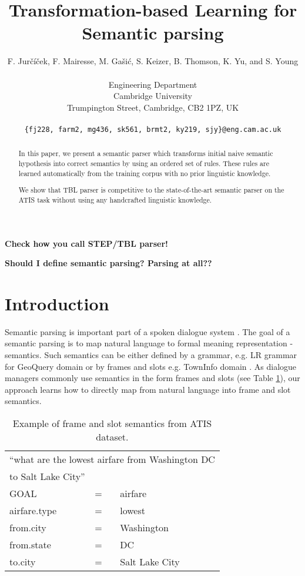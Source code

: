 \documentclass[11pt]{article}
\title{Transformation-based Learning for Semantic parsing}
\author{F. Jur\v{c}\'{i}\v{c}ek, F. Mairesse, M. Ga\v{s}i\'{c}, S. Keizer, B. Thomson, K. Yu, and S. Young \\
\\
Engineering Department \\
Cambridge University \\
Trumpington Street, Cambridge, CB2 1PZ, UK \\
\\
{\tt \{fj228, farm2, mg436, sk561, brmt2, ky219, sjy\}@eng.cam.ac.uk}
}
\date{}
\begin{document}
\maketitle
\begin{abstract}
In this paper, we present a semantic parser which transforms initial naive semantic hypothesis into correct semantics by using an ordered set of rules. These rules are learned automatically from the training corpus with no prior linguistic knowledge.

We show that TBL parser is competitive to the state-of-the-art semantic parser on the ATIS task without using any handcrafted linguistic knowledge.

\end{abstract}

\textbf{Check how you call STEP/TBL parser!}

\textbf{Should I define semantic parsing? Parsing at all??}

\section{Introduction}
Semantic parsing is important part of a spoken dialogue system \cite{williams07}. The goal of a semantic parsing is to map natural language to formal meaning representation - semantics. Such semantics can be either defined by a grammar, e.g. LR grammar for GeoQuery domain \cite{kate05} or by frames and slots e.g. TownInfo domain \cite{thomson08}. As dialogue managers commonly use semantics in the form frames and slots (see Table \ref{tbl:sem:example}), our approach learns how to directly map from natural language into frame and slot semantics.


\begin{table}
\begin{center}
\begin{tabular}{|lll|} 
  \hline
  \multicolumn{3}{l}{``what are the lowest airfare from Washington DC} \\
  \multicolumn{3}{l}{to Salt Lake City''} \\
  \hline
  GOAL          & = & airfare \\
  airfare.type  & = & lowest \\
  from.city     & = & Washington \\
  from.state    & = & DC \\
  to.city       & = & Salt Lake City \\
  \hline
\end{tabular} 
\end{center}
\caption{Example of frame and slot semantics from ATIS \cite{atis94} dataset.}
\label{tbl:sem:example}
\end{table}
\end{document}
